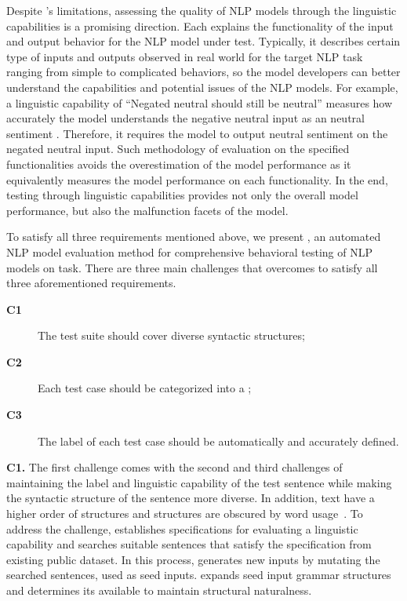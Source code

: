 Despite \Cklst's limitations, assessing the quality of NLP models
through the linguistic capabilities is a promising direction. Each \lc
explains the functionality of the input and output behavior for the
NLP model under test. Typically, it describes certain type of inputs
and outputs observed in real world for the target NLP task ranging
from simple to complicated behaviors, so the model developers can
better understand the capabilities and potential issues of the NLP
models. For example, a linguistic capability of ``Negated neutral
should still be neutral'' measures how accurately the \sa model
understands the negative neutral input as an neutral sentiment
\cite{marcoACL2020checklist}.  Therefore, it requires the \sa model to
output neutral sentiment on the negated neutral input.  Such
methodology of evaluation on the specified functionalities avoids the
overestimation of the model performance as it equivalently measures
the model performance on each functionality.
In the end, testing through linguistic capabilities provides not only
the overall model performance, but also the malfunction facets of the
model.

To satisfy all three requirements mentioned above, we present \tool,
an automated NLP model evaluation method for comprehensive behavioral
testing of NLP models on \sa task.  There are three main challenges
that \tool overcomes to satisfy all three aforementioned requirements.
\begin{description}
\item[{\bf C1}] The test suite should cover diverse syntactic structures;
\item[{\bf C2}] Each test case should be categorized into a \lc;
\item[{\bf C3}] The label of each test case should be automatically
  and accurately defined.
\end{description}

\noindent \textbf{C1.} The first challenge comes with the second and
third challenges of maintaining the label and linguistic capability of
the test sentence while making the syntactic structure of the sentence
more diverse. In addition, text have a higher order of structures and
structures are obscured by word usage~\cite{}. To address the
challenge, \tool establishes specifications for evaluating a
linguistic capability and searches suitable sentences that satisfy the
specification from existing public dataset. In this process, \tool
generates new inputs by mutating the searched sentences, used as seed
inputs. \tool expands seed input grammar structures and determines its
available \pos to maintain structural naturalness.

